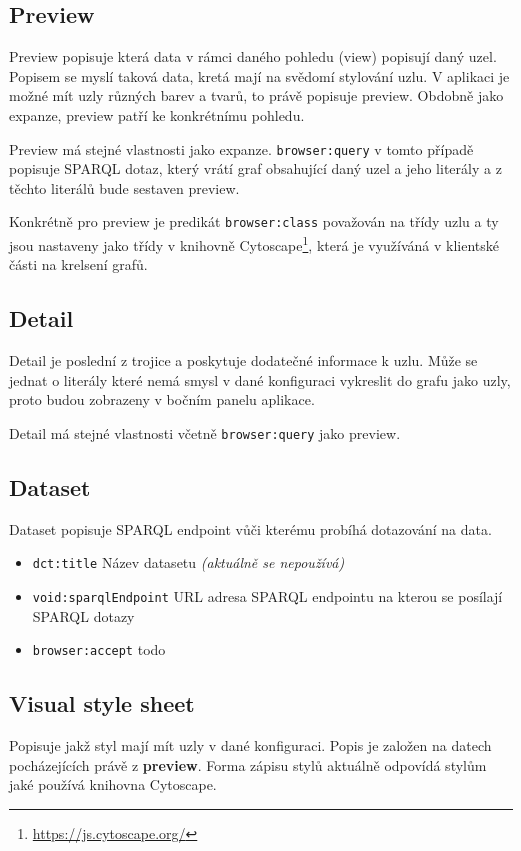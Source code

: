 \subsection{Preview}
Preview popisuje která data v rámci daného pohledu (view) popisují daný uzel. Popisem se myslí taková data, kretá mají na svědomí stylování uzlu. V aplikaci je možné mít uzly různých barev a tvarů, to právě popisuje preview. Obdobně jako expanze, preview patří ke konkrétnímu pohledu.

Preview má stejné vlastnosti jako expanze. \texttt{browser:query} v tomto případě popisuje SPARQL dotaz, který vrátí graf obsahující daný uzel a jeho literály a z těchto literálů bude sestaven preview.

Konkrétně pro preview je predikát \texttt{browser:class} považován na třídy uzlu a ty jsou nastaveny jako třídy v knihovně Cytoscape\footnote{\url{https://js.cytoscape.org/}}, která je využíváná v klientské části na krelsení grafů.

\subsection{Detail}
Detail je poslední z trojice a poskytuje dodatečné informace k uzlu. Může se jednat o literály které nemá smysl v dané konfiguraci vykreslit do grafu jako uzly, proto budou zobrazeny v bočním panelu aplikace.

Detail má stejné vlastnosti včetně \texttt{browser:query} jako preview.

\subsection{Dataset}
Dataset popisuje SPARQL endpoint vůči kterému probíhá dotazování na data.

\begin{itemize}
    \item \texttt{dct:title} Název datasetu \textit{(aktuálně se nepoužívá)}
    \item \texttt{void:sparqlEndpoint} URL adresa SPARQL endpointu na kterou se posílají SPARQL dotazy
    \item \texttt{browser:accept} todo
\end{itemize}

\subsection{Visual style sheet}
Popisuje jakž styl mají mít uzly v dané konfiguraci. Popis je založen na datech pocházejících právě z \textbf{preview}. Forma zápisu stylů aktuálně odpovídá stylům jaké používá knihovna Cytoscape.

